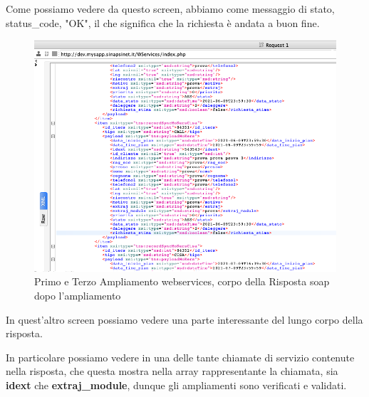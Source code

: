 \begin{flushleft}
	Come possiamo vedere da questo screen, abbiamo come messaggio di stato, \\status\_code, "OK", il che significa che la richiesta è andata a buon fine.
\end{flushleft}
\newpage
\begin{figure}[!h] 
	\centering
	\includegraphics[scale = 0.5]{immagini/webservices/ampliamenti/accettazione/3ampl__risposta_soap_singola-chiamata.png}
	\caption{Primo e Terzo Ampliamento webservices, corpo della Risposta \gls{soap} dopo l'ampliamento}
\end{figure}

\begin{flushleft}
	In quest'altro screen possiamo vedere una parte interessante del lungo corpo della risposta.
	\newspace
	
	In particolare possiamo vedere in una delle tante chiamate di servizio contenute nella risposta, che questa mostra nella array rappresentante la chiamata, sia \textbf{idext} che \textbf{extraj\_module}, dunque gli ampliamenti sono verificati e validati.
\end{flushleft}